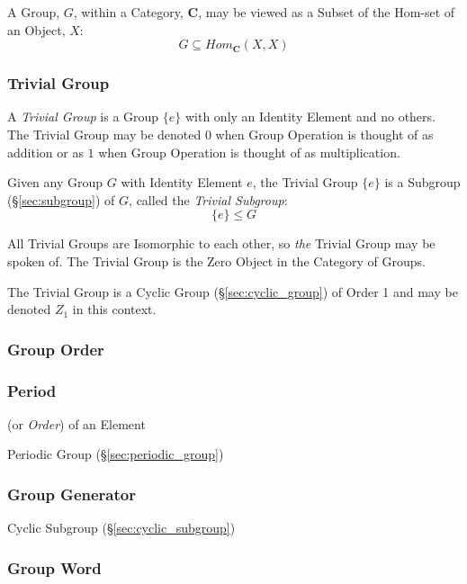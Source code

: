A Group, $G$, within a Category, $\mathbf{C}$, may be viewed as a
Subset of the Hom-set of an Object, $X$:
\[
    G \subseteq Hom_{\mathbf{C}}(X,X)
\]



\subsubsection{Trivial Group}\label{sec:trivial_group}

A \emph{Trivial Group} is a Group $\{e\}$ with only an Identity
Element and no others. The Trivial Group may be denoted $0$ when
Group Operation is thought of as addition or as $1$ when Group
Operation is thought of as multiplication.

Given any Group $G$ with Identity Element $e$, the Trivial Group
$\{e\}$ is a Subgroup (\S\ref{sec:subgroup}) of $G$, called the
\emph{Trivial Subgroup}:
\[
    \{e\} \leq G
\]

All Trivial Groups are Isomorphic to each other, so \emph{the} Trivial
Group may be spoken of. The Trivial Group is the Zero Object in the
Category of Groups.

The Trivial Group is a Cyclic Group (\S\ref{sec:cyclic_group}) of
Order 1 and may be denoted $Z_1$ in this context.



\subsubsection{Group Order}\label{sec:group_order}

\subsubsection{Period}\label{sec:period}

(or \emph{Order}) of an Element

Periodic Group (\S\ref{sec:periodic_group})



\subsubsection{Group Generator}\label{sec:group_generator}

Cyclic Subgroup (\S\ref{sec:cyclic_subgroup})



\subsubsection{Group Word}\label{sec:group_word}

